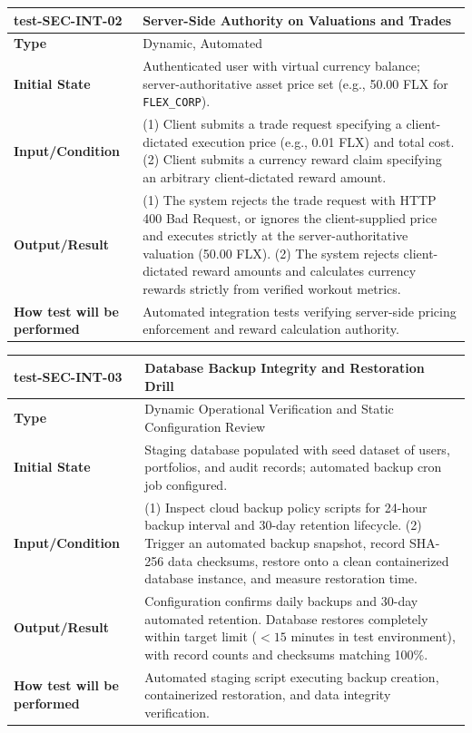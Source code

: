 \documentclass[12pt, titlepage]{article}
\begin{document}
\vspace{1em}

\noindent\begin{tabularx}{\textwidth}{>{\raggedright\arraybackslash}p{3.5cm}X}
  \toprule
  \textbf{test-SEC-INT-02} & \textbf{Server-Side Authority on Valuations and Trades}\\
  \midrule
  \textbf{Type} & Dynamic, Automated\\
  \textbf{Initial State} & Authenticated user with virtual currency balance; server-authoritative asset price set (e.g., 50.00 FLX for \texttt{FLEX\_CORP}).\\
  \textbf{Input/Condition} & (1) Client submits a trade request specifying a client-dictated execution price (e.g., 0.01 FLX) and total cost. (2) Client submits a currency reward claim specifying an arbitrary client-dictated reward amount.\\
  \textbf{Output/Result} & (1) The system rejects the trade request with HTTP 400 Bad Request, or ignores the client-supplied price and executes strictly at the server-authoritative valuation (50.00 FLX). (2) The system rejects client-dictated reward amounts and calculates currency rewards strictly from verified workout metrics.\\
  \textbf{How test will be performed} & Automated integration tests verifying server-side pricing enforcement and reward calculation authority.\\
  \bottomrule
\end{tabularx}

\vspace{1em}

\noindent\begin{tabularx}{\textwidth}{>{\raggedright\arraybackslash}p{3.5cm}X}
  \toprule
  \textbf{test-SEC-INT-03} & \textbf{Database Backup Integrity and Restoration Drill}\\
  \midrule
  \textbf{Type} & Dynamic Operational Verification and Static Configuration Review\\
  \textbf{Initial State} & Staging database populated with seed dataset of users, portfolios, and audit records; automated backup cron job configured.\\
  \textbf{Input/Condition} & (1) Inspect cloud backup policy scripts for 24-hour backup interval and 30-day retention lifecycle. (2) Trigger an automated backup snapshot, record SHA-256 data checksums, restore onto a clean containerized database instance, and measure restoration time.\\
  \textbf{Output/Result} & Configuration confirms daily backups and 30-day automated retention. Database restores completely within target limit ($< 15$ minutes in test environment), with record counts and checksums matching 100\%.\\
  \textbf{How test will be performed} & Automated staging script executing backup creation, containerized restoration, and data integrity verification.\\
  \bottomrule
\end{tabularx}
\end{document}
